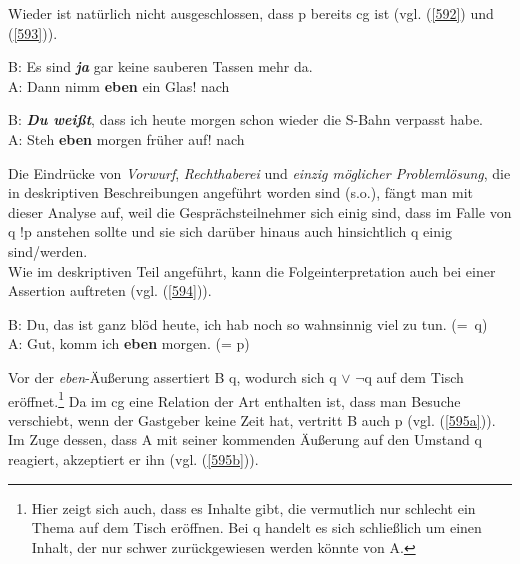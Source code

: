 Wieder ist natürlich nicht ausgeschlossen, dass p bereits cg ist (vgl. (\ref{592}) und (\ref{593})).

\begin{exe}
	\ex\label{592}
	B: Es sind \textbf{\textit{ja}} gar keine sauberen Tassen mehr da.\\
	A: Dann nimm \textbf{eben} ein Glas!  
	\hfill\hbox {nach \citet[105]{Dahl1988}}
\end{exe}

\begin{exe}
	\ex\label{593}
	B: \textbf{\textit{Du weißt}}, dass ich heute morgen schon wieder die S-Bahn verpasst habe.\\
	A: Steh \textbf{eben} morgen früher auf!	  
	\hfill\hbox {nach \citet[122]{Thurmair1989}}
\end{exe}			
Die Eindrücke von \textit{Vorwurf}, \textit{Rechthaberei} und \textit{einzig möglicher Problemlösung}, die in deskriptiven Beschreibungen angeführt worden sind (s.o.), fängt man mit dieser Analyse auf, weil die Gesprächsteilnehmer sich einig sind, dass im Falle von q !p anstehen sollte und sie sich darüber hinaus auch hinsichtlich q einig sind/werden.\\
\newline
Wie im deskriptiven Teil angeführt, kann die Folgeinterpretation auch bei einer Assertion auftreten (vgl. (\ref{594})).
\begin{exe}
	\ex\label{594}
	B: Du, das ist ganz blöd heute, ich hab noch so wahnsinnig viel zu tun.
	\newline
	\hbox{}\hfill\hbox{(= q)} \\
	A: Gut, komm ich \textbf{eben} morgen. (= p)
	\hfill\hbox {\citet[121]{Thurmair1989}}
\end{exe}
Vor der \textit{eben}-Äußerung assertiert B q, wodurch sich q $\vee$ $\neg$q auf dem Tisch eröffnet.\footnote{Hier zeigt sich auch, dass es Inhalte gibt, die vermutlich nur schlecht ein Thema auf dem Tisch eröffnen. Bei q handelt es sich schließlich um einen Inhalt, der nur schwer zurückgewiesen werden könnte von A.} Da im cg eine Relation der Art enthalten ist, dass man Besuche verschiebt, wenn der Gastgeber keine Zeit hat, vertritt B auch p (vgl. (\ref{595a})). Im Zuge dessen, dass A mit seiner kommenden Äußerung auf den Umstand q reagiert, akzeptiert er ihn (vgl. (\ref{595b})).

